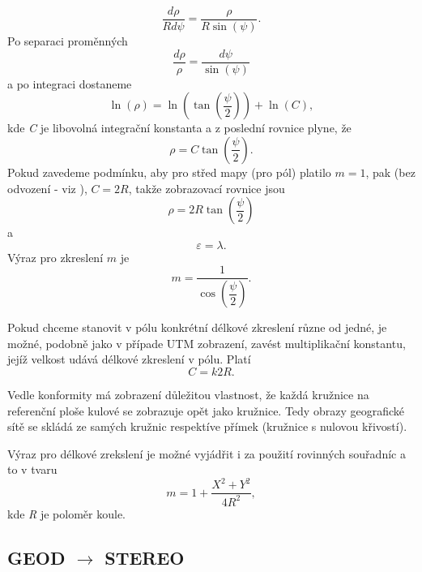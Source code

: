 \begin{equation}
\dfrac{d\rho}{Rd\psi} = \dfrac{\rho}{R\sin{\left(\psi\right)}}.
\end{equation} 
Po separaci proměnných 
\begin{equation}
\dfrac{d\rho}{\rho} = \dfrac{d\psi}{\sin{\left(\psi\right)}}
\end{equation}
a po integraci dostaneme
\begin{equation}
\ln{\left(\rho\right)} = \ln{\left(\tan{\left(\dfrac{\psi}{2}\right)}\right)} + \ln{\left(C\right)},
\end{equation}
kde \textit{C} je libovolná integrační konstanta a z poslední rovnice plyne, že
\begin{equation}
\rho = C\tan{\left(\dfrac{\psi}{2}\right)}.
\end{equation}
Pokud zavedeme podmínku, aby pro střed mapy (pro pól) platilo $m = 1$, pak (bez odvození - viz \cite{Buchar2002}), $C = 2R$, takže zobrazovací rovnice jsou
\begin{equation}
\rho = 2R\tan{\left(\dfrac{\psi}{2}\right)}
\end{equation}
a
\begin{equation}
\varepsilon = \lambda.
\end{equation}
Výraz pro zkreslení $m$ je
\begin{equation}
m = \dfrac{1}{\cos{\left(\dfrac{\psi}{2}\right)}}.
\end{equation}

Pokud chceme stanovit v pólu konkrétní délkové zkreslení různe od jedné, je možné, podobně jako v případe UTM zobrazení, zavést multiplikační konstantu, jejíž velkost udává délkové zkreslení v pólu. Platí
\begin{equation}
C = k2R.
\end{equation}

Vedle konformity má zobrazení důležitou vlastnost, že každá kružnice na referenční ploše kulové se zobrazuje opět jako kružnice. Tedy obrazy geografické sítě se skládá ze samých kružnic respektíve přímek (kružnice s nulovou křivostí).

Výraz pro délkové zrekslení je možné vyjádřit i za použití rovinných souřadníc a to v tvaru
\begin{equation}
m = 1+\dfrac{X^{2}+Y^{2}}{4R^{2}}, 
\end{equation}
kde \textit{R} je poloměr koule.

\newpage
\subsection{GEOD $\rightarrow$ STEREO}

